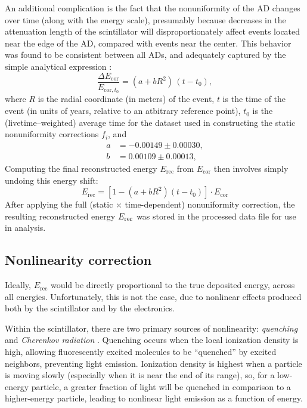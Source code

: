 \documentclass[../thesis.tex]{subfiles}
\begin{document}
An additional complication is the fact that the nonuniformity of the AD changes over time (along with the energy scale), presumably because decreases in the attenuation length of the scintillator will disproportionately affect events located near the edge of the AD, compared with events near the center. This behavior was found to be consistent between all ADs, and adequately captured by the simple analytical expression \cite[p. 16]{yuryNonUni2}:
\begin{equation}
  \frac{\Delta E_{\mathrm{cor}}}{E_{\mathrm{cor},t_0}} = (a + b R^2)\, (t - t_0),
\end{equation}
where $R$ is the radial coordinate (in meters) of the event, $t$ is the time of the event (in units of years, relative to an atbitrary reference point), $t_0$ is the (livetime--weighted) average time for the dataset used in constructing the static nonuniformity corrections $f_i$, and
\begin{align*}
  a &= -0.00149 \pm 0.00030,\\
  b &= 0.00109 \pm 0.00013,
\end{align*}
Computing the final reconstructed energy $E_{\mathrm{rec}}$ from $E_{\mathrm{cor}}$ then involves simply undoing this energy shift:
\begin{equation}
  E_{\mathrm{rec}} = \left[ 1 - (a + b R^2) (t - t_0) \right] \cdot E_{\mathrm{cor}}
\end{equation}
After applying the full (static $\times$ time-dependent) nonuniformity correction, the resulting reconstructed energy $E_\mathrm{rec}$ was stored in the processed data file for use in analysis.

\subsection{Nonlinearity correction}
\label{sec:reconEnergyNL}

Ideally, $E_{\mathrm{rec}}$ would be directly proportional to the true deposited energy, across all energies. Unfortunately, this is not the case, due to nonlinear effects produced both by the scintillator and by the electronics.

Within the scintillator, there are two primary sources of nonlinearity: \emph{quenching} \cite{Birks_1951} and \emph{Cherenkov radiation} \cite{cerenkov}. Quenching occurs when the local ionization density is high, allowing fluorescently excited molecules to be ``quenched'' by excited neighbors, preventing light emission. Ionization density is highest when a particle is moving slowly (especially when it is near the end of its range), so, for a low-energy particle, a greater fraction of light will be quenched in comparison to a higher-energy particle, leading to nonlinear light emission as a function of energy.
\end{document}
